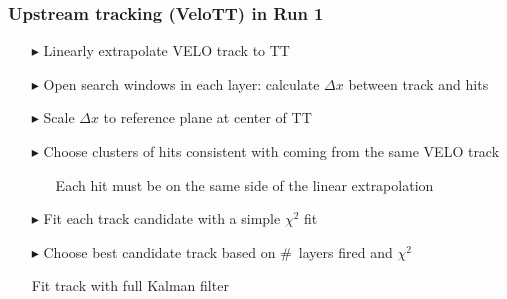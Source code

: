 \documentclass[aspectratio=1610]{beamer}
\begin{document}
\begin{frame}\frametitle{Upstream tracking (VeloTT) in Run 1}
  \begin{itemize}
  \item[$\blacktriangleright$] Linearly extrapolate VELO track to TT
  \item[$\blacktriangleright$] Open search windows in each layer: calculate $\Delta x$ between track and hits
  \item[$\blacktriangleright$] Scale $\Delta x$ to reference plane at center of TT
  \item[$\blacktriangleright$] Choose clusters of hits consistent with coming from the same VELO track
  \begin{itemize}
    \item[\ding{80}] Each hit must be on the same side of the linear extrapolation
  \end{itemize}
  \item[$\blacktriangleright$] Fit each track candidate with a simple $\chi^{2}$ fit
  \item[$\blacktriangleright$] Choose best candidate track based on \mbox{\# layers} fired and $\chi^{2}$
  \item[\ding{80}] Fit track with full Kalman filter
  \end{itemize}
  
\end{frame}
\end{document}
